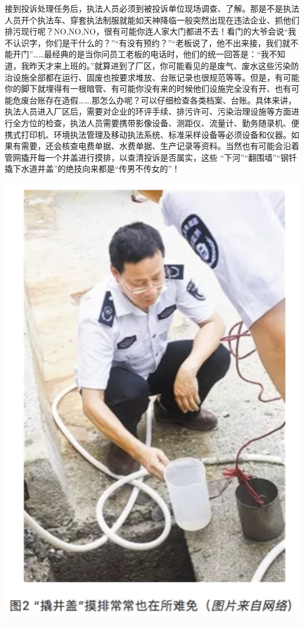 \documentclass[]{book}
\begin{document}
接到投诉处理任务后，执法人员必须到被投诉单位现场调查、了解。那是不是执法人员开个执法车、穿套执法制服就能如天神降临一般突然出现在违法企业、抓他们排污现行呢？NO,NO,NO，很有可能你连人家大门都进不去！看门的大爷会说``我不认识字，你们是干什么的？''``有没有预约？''``老板说了，他不出来接，我们就不能开门''\ldots{}\ldots{}最经典的是当你问员工老板的电话时，他们的统一回答是：``我不知道，我昨天才来上班的。''就算进到了厂区，你可能看见的是废气、废水这些污染防治设施全部都在运行、固废也按要求堆放、台账记录也很规范等等。但是，有可能你的脚下就埋得有一根暗管、有可能你没有来的时候他们设施完全没有开、也有可能危废台账存在造假\ldots{}\ldots{}.那怎么办呢？可以仔细检查各类档案、台账。具体来讲，执法人员进入厂区后，需要对企业的环评手续、排污许可、污染治理设施等方面进行全方位的检查，执法人员需要携带影像设备、测距仪、流量计、勤务随录机、便携式打印机、环境执法管理及移动执法系统、标准采样设备等必须设备和仪器。如果有需要，还会核查电费单据、水费单据、生产记录等资料。当然也有可能会沿着管网撬开每一个井盖进行摸排，以查清投诉是否属实，这些
``下河''``翻围墙''``钢钎撬下水道井盖''的绝技向来都是``传男不传女的''！

\includegraphics[width=5.58in]{images/hjzf2}
\end{document}
